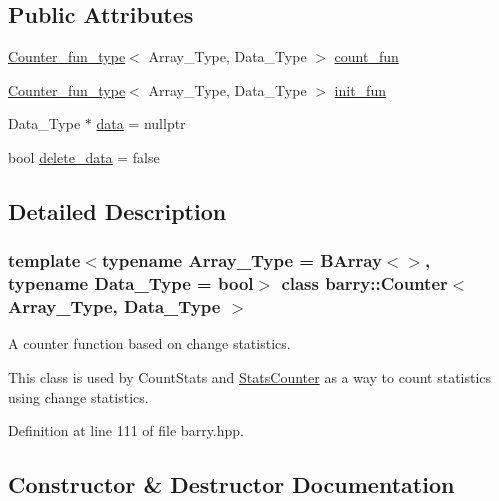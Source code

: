 \subsection*{Public Attributes}
\begin{DoxyCompactItemize}
\item 
\hyperlink{namespacebarry_abaaae3200da8e4b7faac3c04fe9c3081}{Counter\+\_\+fun\+\_\+type}$<$ Array\+\_\+\+Type, Data\+\_\+\+Type $>$ \hyperlink{classbarry_1_1_counter_aa535e164838a3a9c780e8d15fe45679b}{count\+\_\+fun}
\item 
\hyperlink{namespacebarry_abaaae3200da8e4b7faac3c04fe9c3081}{Counter\+\_\+fun\+\_\+type}$<$ Array\+\_\+\+Type, Data\+\_\+\+Type $>$ \hyperlink{classbarry_1_1_counter_a2509d75d3fc9e33d708911a38373d8ab}{init\+\_\+fun}
\item 
Data\+\_\+\+Type $\ast$ \hyperlink{classbarry_1_1_counter_af8196eeaaa4b58b788969c07aee7f1ee}{data} = nullptr
\item 
bool \hyperlink{classbarry_1_1_counter_a5445fa47abeff4b5675a5e5c12e4917a}{delete\+\_\+data} = false
\end{DoxyCompactItemize}


\subsection{Detailed Description}
\subsubsection*{template$<$typename Array\+\_\+\+Type = B\+Array$<$$>$, typename Data\+\_\+\+Type = bool$>$\newline
class barry\+::\+Counter$<$ Array\+\_\+\+Type, Data\+\_\+\+Type $>$}

A counter function based on change statistics. 

This class is used by {\ttfamily Count\+Stats} and {\ttfamily \hyperlink{classbarry_1_1_stats_counter}{Stats\+Counter}} as a way to count statistics using change statistics. 

Definition at line 111 of file barry.\+hpp.



\subsection{Constructor \& Destructor Documentation}
\mbox{\label{classbarry_1_1_counter_a3c990d6dbcdc553b3179c8353497a7df}} 
